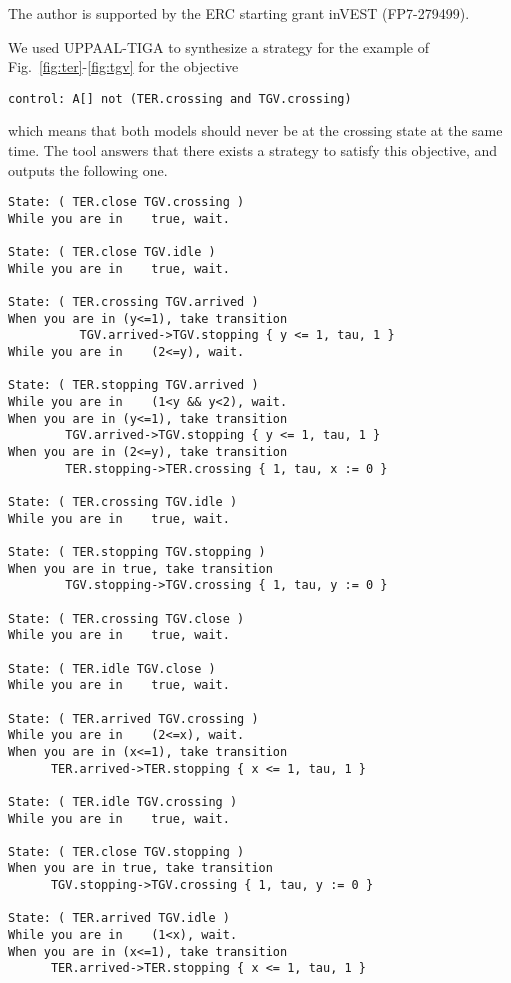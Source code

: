 \documentclass{article}
\begin{document}
The author is supported by the ERC starting grant inVEST (FP7-279499).



 
\appendix
We used UPPAAL-TIGA to synthesize a strategy for the example of
Fig.~\cref{fig:ter}-\cref{fig:tgv} for the objective
{\small
\begin{verbatim}
control: A[] not (TER.crossing and TGV.crossing)
\end{verbatim}
}
\noindent which means that both models should never be at the crossing state at the same
time.
The tool answers that there exists a strategy to satisfy this objective, and
outputs the following one.
\scriptsize
\begin{verbatim}
State: ( TER.close TGV.crossing ) 
While you are in	true, wait.

State: ( TER.close TGV.idle ) 
While you are in	true, wait.

State: ( TER.crossing TGV.arrived ) 
When you are in (y<=1), take transition 
          TGV.arrived->TGV.stopping { y <= 1, tau, 1 }
While you are in	(2<=y), wait.

State: ( TER.stopping TGV.arrived ) 
While you are in	(1<y && y<2), wait.
When you are in (y<=1), take transition 
        TGV.arrived->TGV.stopping { y <= 1, tau, 1 }
When you are in (2<=y), take transition 
        TER.stopping->TER.crossing { 1, tau, x := 0 }

State: ( TER.crossing TGV.idle ) 
While you are in	true, wait.

State: ( TER.stopping TGV.stopping ) 
When you are in true, take transition 
        TGV.stopping->TGV.crossing { 1, tau, y := 0 }

State: ( TER.crossing TGV.close ) 
While you are in	true, wait.

State: ( TER.idle TGV.close ) 
While you are in	true, wait.

State: ( TER.arrived TGV.crossing ) 
While you are in	(2<=x), wait.
When you are in (x<=1), take transition 
      TER.arrived->TER.stopping { x <= 1, tau, 1 }

State: ( TER.idle TGV.crossing ) 
While you are in	true, wait.

State: ( TER.close TGV.stopping ) 
When you are in true, take transition 
      TGV.stopping->TGV.crossing { 1, tau, y := 0 }

State: ( TER.arrived TGV.idle ) 
While you are in	(1<x), wait.
When you are in (x<=1), take transition 
      TER.arrived->TER.stopping { x <= 1, tau, 1 }


\end{verbatim}
\end{document}
